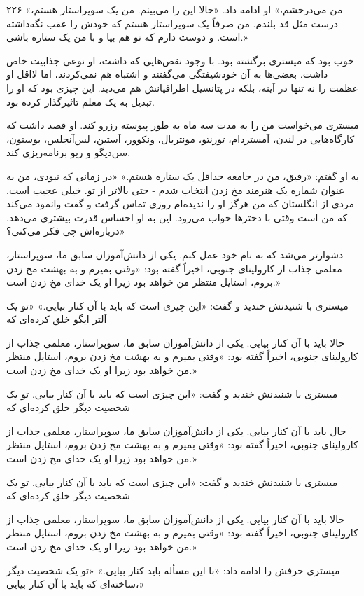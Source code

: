 ۲۲۶  
«من می‌درخشم،» او ادامه داد. «حالا این را می‌بینم. من یک سوپراستار هستم، درست مثل قد بلندم. من صرفاً یک سوپراستار هستم که خودش را عقب نگه‌داشته است. و دوست دارم که تو هم بیا و با من یک ستاره باشی.»

خوب بود که میستری برگشته بود. با وجود نقص‌هایی که داشت، او نوعی جذابیت خاص داشت. بعضی‌ها به آن خودشیفتگی می‌گفتند و اشتباه هم نمی‌کردند، اما لااقل او عظمت را نه تنها در آینه، بلکه در پتانسیل اطرافیانش هم می‌دید. این چیزی بود که او را تبدیل به یک معلم تاثیرگذار کرده بود.

میستری می‌خواست من را به مدت سه ماه به طور پیوسته رزرو کند. او قصد داشت که کارگاه‌هایی در لندن، آمستردام، تورنتو، مونتریال، ونکوور، آستین، لس‌آنجلس، بوستون، سن‌دیگو و ریو برنامه‌ریزی کند.

به او گفتم: «رفیق، من در جامعه حداقل یک ستاره هستم.» «در زمانی که نبودی، من به عنوان شماره یک هنرمند مخ زدن انتخاب شدم - حتی بالاتر از تو. خیلی عجیب است. مردی از انگلستان که من هرگز او را ندیده‌ام روزی تماس گرفت و گفت وانمود می‌کند که من است وقتی با دخترها خواب می‌رود. این به او احساس قدرت بیشتری می‌دهد. درباره‌اش چی فکر می‌کنی؟»

دشوارتر می‌شد که به نام خود عمل کنم. یکی از دانش‌آموزان سابق ما، سوپراستار، معلمی جذاب از کارولینای جنوبی، اخیراً گفته بود: «وقتی بمیرم و به بهشت مخ زدن بروم، استایل منتظر من خواهد بود زیرا او یک خدای مخ زدن است.»

میستری با شنیدنش خندید و گفت: «این چیزی است که باید با آن کنار بیایی.» «تو یک آلتر ایگو خلق کرده‌ای که 

حالا باید با آن کنار بیایی. یکی از دانش‌آموزان سابق ما، سوپراستار، معلمی جذاب از کارولینای جنوبی، اخیراً گفته بود: «وقتی بمیرم و به بهشت مخ زدن بروم، استایل منتظر من خواهد بود زیرا او یک خدای مخ زدن است.»

میستری با شنیدنش خندید و گفت: «این چیزی است که باید با آن کنار بیایی. تو یک شخصیت دیگر خلق کرده‌ای که

حال باید با آن کنار بیایی. یکی از دانش‌آموزان سابق ما، سوپراستار، معلمی جذاب از کارولینای جنوبی، اخیراً گفته بود: «وقتی بمیرم و به بهشت مخ زدن بروم، استایل منتظر من خواهد بود زیرا او یک خدای مخ زدن است.»

میستری با شنیدنش خندید و گفت: «این چیزی است که باید با آن کنار بیایی. تو یک شخصیت دیگر خلق کرده‌ای که

حالا باید با آن کنار بیایی. یکی از دانش‌آموزان سابق ما، سوپراستار، معلمی جذاب از کارولینای جنوبی، اخیراً گفته بود: «وقتی بمیرم و به بهشت مخ زدن بروم، استایل منتظر من خواهد بود زیرا او یک خدای مخ زدن است.»

میستری حرفش را ادامه داد: «با این مسأله باید کنار بیایی.» «تو یک شخصیت دیگر ساخته‌ای که باید با آن کنار بیایی،»

